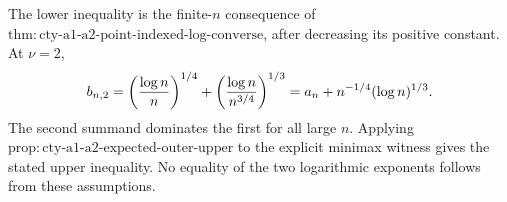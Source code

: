 The lower inequality is the finite-\(n\) consequence of \(\mathrm{thm:cty\text{-}a1\text{-}a2\text{-}point\text{-}indexed\text{-}log\text{-}converse}\), after decreasing its positive constant.  At \(\nu=2\),
\[
 b_{n,2}=\left({\log n\over n}\right)^{1/4}
 +\left({\log n\over n^{3/4}}\right)^{1/3}
 =a_n+n^{-1/4}(\log n)^{1/3}.
\]
The second summand dominates the first for all large \(n\).  Applying \(\mathrm{prop:cty\text{-}a1\text{-}a2\text{-}expected\text{-}outer\text{-}upper}\) to the explicit minimax witness gives the stated upper inequality.  No equality of the two logarithmic exponents follows from these assumptions.
